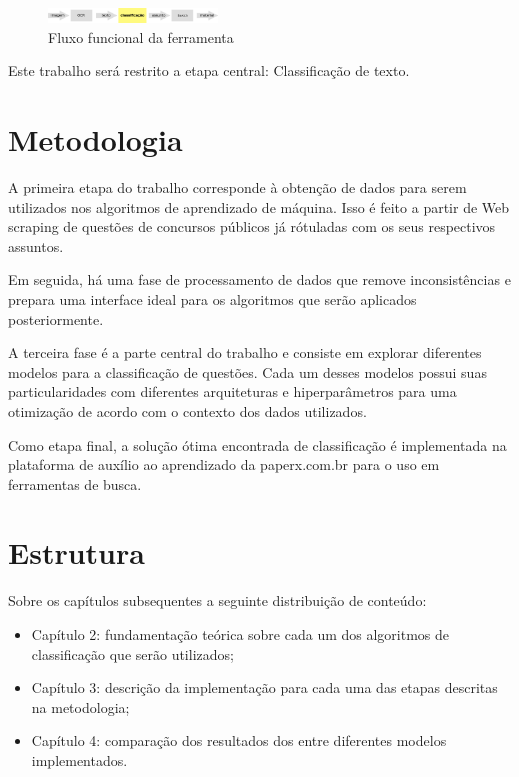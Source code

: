 \begin{figure}[!ht]
	\centering
	\includegraphics[width=0.4\textwidth]{figures/fluxograma.png}   
	\caption{Fluxo funcional da ferramenta}
	\label{fig:fluxograma}
\end{figure}

Este trabalho será restrito a etapa central: Classificação de texto.



\section{Metodologia}
A primeira etapa do trabalho corresponde à obtenção de dados para serem utilizados nos algoritmos de aprendizado de máquina. Isso é feito a partir de Web scraping de questões de concursos públicos já rótuladas com os seus respectivos assuntos.

Em seguida, há uma fase de processamento de dados que remove inconsistências e prepara uma interface ideal para os algoritmos que serão aplicados posteriormente.

A terceira fase é a parte central do trabalho e consiste em explorar diferentes modelos para a classificação de questões. Cada um desses modelos possui suas particularidades com diferentes arquiteturas e hiperparâmetros para uma otimização de acordo com o contexto dos dados utilizados.

Como etapa final, a solução ótima encontrada de classificação é implementada na plataforma de auxílio ao aprendizado da paperx.com.br para o uso em ferramentas de busca.


\section{Estrutura}
Sobre os capítulos subsequentes a seguinte distribuição de conteúdo:
\begin{itemize}
\item Capítulo 2: 
fundamentação teórica sobre cada um dos algoritmos de classificação que serão utilizados;
\item Capítulo 3:
descrição da implementação para cada uma das etapas descritas na metodologia;
\item Capítulo 4:
comparação dos resultados dos entre diferentes modelos implementados.
\end{itemize}